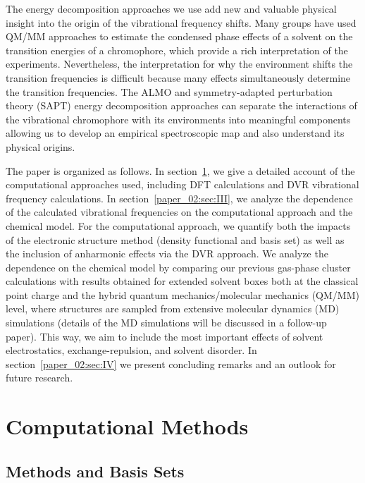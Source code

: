 The energy decomposition approaches we use add new and valuable physical insight into the origin of the vibrational frequency shifts. Many groups have used QM/MM approaches to estimate the condensed phase effects of a solvent on the transition energies of a chromophore, which provide a rich interpretation of the experiments\cite{choiJCP-08,Lindquist2008,Terranova2014,liJPC-06,Schmidt2008}. Nevertheless, the interpretation for why the environment shifts the transition frequencies is difficult because many effects simultaneously determine the transition frequencies. The ALMO and symmetry-adapted perturbation theory (SAPT) energy decomposition approaches can separate the interactions of the vibrational chromophore with its environments into meaningful components allowing us to develop an empirical spectroscopic map and also understand its physical origins.

The paper is organized as follows. In section~\ref{paper_02:sec:II}, we give a detailed account of the computational approaches used, including DFT calculations and DVR vibrational frequency calculations. In section~\ref{paper_02:sec:III}, we analyze the dependence of the calculated  vibrational frequencies on the computational approach and the chemical model. For the computational approach, we quantify both the impacts of the electronic structure method (density functional and basis set) as well as the inclusion of anharmonic effects via the DVR approach. We analyze the dependence on the chemical model by comparing our previous gas-phase cluster calculations with results obtained for extended solvent boxes both at the classical point charge and the hybrid quantum mechanics/molecular mechanics (QM/MM) level, where structures are sampled from extensive molecular dynamics (MD) simulations (details of the MD simulations will be discussed in a follow-up paper\cite{Daly2016}). This way, we aim to include the most important effects of solvent electrostatics, exchange-repulsion, and solvent disorder. In section~\ref{paper_02:sec:IV} we present concluding remarks and an outlook for future research.

\section{Computational Methods}
\label{paper_02:sec:II}

\subsection{Methods and Basis Sets}
\label{paper_02:ssec:IIA}

